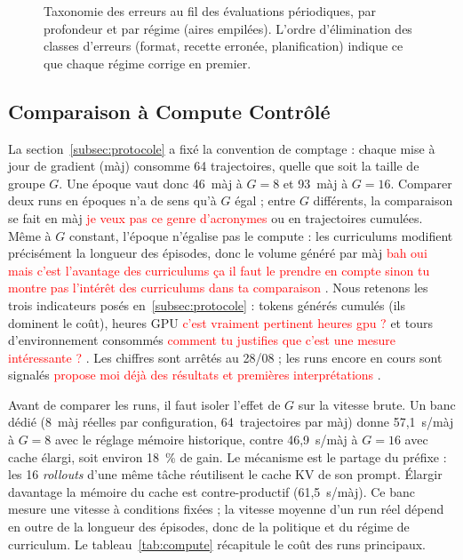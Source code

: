 \documentclass[11pt,a4paper]{article}
\begin{document}
\begin{figure}[htbp]
  \centering
  \caption{Taxonomie des erreurs au fil des évaluations périodiques, par profondeur et par régime (aires empilées). L'ordre d'élimination des classes d'erreurs (format, recette erronée, planification) indique ce que chaque régime corrige en premier.}
  \label{fig:elimination_erreurs}
\end{figure}


\subsection{Comparaison à Compute Contrôlé}
\label{subsec:compute-controle}

La section~\ref{subsec:protocole} a fixé la convention de comptage : chaque mise à jour de gradient (màj) consomme 64 trajectoires, quelle que soit la taille de groupe $G$. Une époque vaut donc 46~màj à $G=8$ et 93~màj à $G=16$. Comparer deux runs en époques n'a de sens qu'à $G$ égal ; entre $G$ différents, la comparaison se fait en màj \textcolor{red}{je veux pas ce genre d'acronymes} ou en trajectoires cumulées. Même à $G$ constant, l'époque n'égalise pas le compute : les curriculums modifient précisément la longueur des épisodes, donc le volume généré par màj \textcolor{red}{bah oui mais c'est l'avantage des curriculums ça il faut le prendre en compte sinon tu montre pas l'intérêt des curriculums dans ta comparaison} . Nous retenons les trois indicateurs posés en~\ref{subsec:protocole} : tokens générés cumulés (ils dominent le coût), heures GPU \textcolor{red}{c'est vraiment pertinent heures gpu ?} et tours d'environnement consommés \textcolor{red}{comment tu justifies que c'est une mesure intéressante ?} . Les chiffres sont arrêtés au 28/08 ; les runs encore en cours sont signalés \textcolor{red}{propose moi déjà des résultats et premières interprétations} .



Avant de comparer les runs, il faut isoler l'effet de $G$ sur la vitesse brute. Un banc dédié (8~màj réelles par configuration, 64~trajectoires par màj) donne 57{,}1~s/màj à $G=8$ avec le réglage mémoire historique, contre 46{,}9~s/màj à $G=16$ avec cache élargi, soit environ 18~\% de gain. Le mécanisme est le partage du préfixe : les 16 \emph{rollouts} d'une même tâche réutilisent le cache KV de son prompt. Élargir davantage la mémoire du cache est contre-productif (61{,}5~s/màj). Ce banc mesure une vitesse à conditions fixées ; la vitesse moyenne d'un run réel dépend en outre de la longueur des épisodes, donc de la politique et du régime de curriculum. Le tableau~\ref{tab:compute} récapitule le coût des runs principaux.
\end{document}
